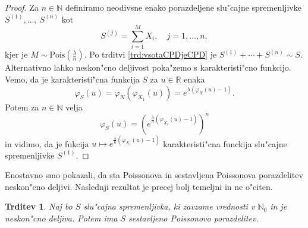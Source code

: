 \documentclass[12pt, a4paper, reqno]{amsart}
\theoremstyle{definition}
\theoremstyle{plain}
\newtheorem{trditev}[definicija]{Trditev}
\newcommand{\R}{\mathbb{R}}
\newcommand{\N}{\mathbb{N}}
\newcommand{\1}{\mathds{1}}
\newcommand{\Pois}[1]{\text{Pois}(#1)}
\begin{document}
    \begin{proof}
        Za $n\in\N$ definiramo neodivsne enako porazdeljene slu"cajne spremenljivke $S^{(1)}, \dots, \ S^{(n)}$ 
        kot
        \begin{equation*}
            S^{(j)} = \sum_{i=1}^{M}X_i, \quad j = 1, \dots, n,
        \end{equation*}
        kjer je $M\sim\Pois{\frac{\lambda}{n}}$. Po trditvi \ref{trd:vsotaCPDjeCPD} je 
        $S^{(1)} + \cdots + S^{(n)}\sim S$. Alternativno lahko neskon"cno deljivost poka"zemo s karakteristi"cno funkcijo.
        Vemo, da je karakteristi"cna funkcija $S$ za $u\in \R$ enaka
        \begin{equation*}
            \varphi_S(u) = \varphi_N\left(\varphi_{X_1}(u)\right) = e^{\lambda\left(\varphi_X(u) - 1\right)}.
        \end{equation*}
        Potem za $n\in\N$ velja
        \begin{equation*}
            \varphi_{S}(u) = \left(e^{\frac{\lambda}{n}\left(\varphi_{X_1}(u) - 1\right)}\right)^n
        \end{equation*}
        in vidimo, da je fukcija $u\mapsto e^{\frac{\lambda}{n}\left(\varphi_{X_1}(u) - 1\right)}$ karakteristi"cna
        funckija slu"cajne spremenljivke $S^{(1)}$.
    \end{proof}

    Enostavno smo pokazali, da sta Poissonova in sestavljena Poissonova porazdelitev neskon"cno deljivi. 
    Naslednji rezultat je precej bolj temeljni in ne o"citen.
    
    \begin{trditev}
        Naj bo $S$ slu"cajna spremenljivka, ki zavzame vrednosti v $\N_0$ in je neskon"cno deljiva.
        Potem ima $S$ sestavljeno Poissonovo porazdelitev.
        \label{trd:neskoncnoDeljivaYslediCPD}
    \end{trditev}
\end{document}
